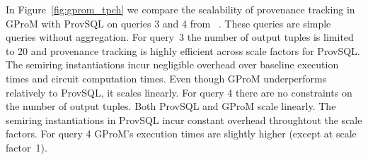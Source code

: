 In Figure~\ref{fig:gprom_tpch} we compare the scalability of provenance tracking in GProM with ProvSQL on queries 3 and 4 from \qtpce\ .
These queries are simple queries without aggregation. For query~3
the number of output tuples is limited to 20 and provenance tracking is
highly efficient across scale factors for ProvSQL. The semiring instantiations incur negligible overhead over baseline execution times
and circuit computation times. Even though GProM underperforms relatively to ProvSQL, it scales linearly.
For query 4 there are no constraints on the number of output tuples. Both ProvSQL and GProM scale linearly. The semiring instantiations in ProvSQL
incur constant overhead throughtout the scale factors. For query 4
GProM's execution times are slightly higher (except at scale factor~1).



